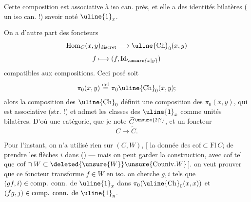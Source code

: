 Cette composition est associative à iso can. près, et elle a des identités bilatères ( un iso can. !) savoir
 noté $\uline{1}_x$.

On a d'autre part des  foncteurs
\[\operatorname{Hom}_C(x,y)_{\text{discret}}\longrightarrow\uline{\mathrm{Ch}}_0(x,y)\]
\[f\longmapsto(f,\operatorname{Id}_{\unsure{x|y}})\]
compatibles aux compositions. Ceci posé soit
\[\pi_0(x,y)\overset{\mathrm{def}}=\pi_0\uline{\mathrm{Ch}}_0(x,y);\]
alors la composition des $\uline{\mathrm{Ch}}_0$ définit une composition des $\pi_0(x,y)$, qui est associative (str. !) et admet les classes des $\uline{1}_x$ comme unités bilatères. D'où une catégorie, que je note $\widetilde C^{\unsure{2|?}}$, et un foncteur
\[C\longrightarrow\widetilde C.\]

Pour l'instant, on n'a utilisé rien sur $(C,W)$, [  la donnée des $\mathrm{cof}\subset\mathrm{Fl}\,C$;  de prendre les flèches $i$ dans () --- mais  on peut garder la construction, avec $\mathrm{cof}$  tel que $\mathrm{cof}\cap W\subset\deleted{\unsure{W}}\unsure{\mathrm{Couniv.}W}$].   on veut prouver que ce foncteur transforme $f\in W$ en iso.
on cherche $g,i$ tels que $(gf,i)\in\text{comp. conn. de }\uline{1}_x$ dans $\pi_0(\uline{\mathrm{Ch}}_0(x,x))$ et $(\bar f g,j)\in\text{comp. conn. de }\uline{1}_y$.
